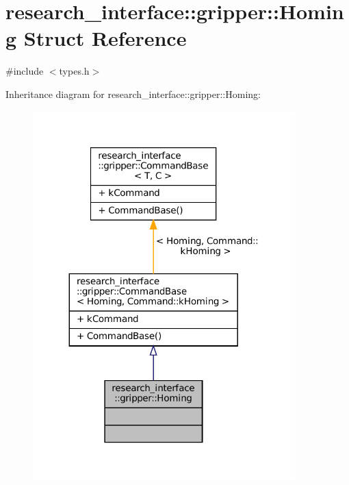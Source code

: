 \hypertarget{structresearch__interface_1_1gripper_1_1Homing}{}\section{research\+\_\+interface\+:\+:gripper\+:\+:Homing Struct Reference}
\label{structresearch__interface_1_1gripper_1_1Homing}


{\ttfamily \#include $<$types.\+h$>$}



Inheritance diagram for research\+\_\+interface\+:\+:gripper\+:\+:Homing\+:
\nopagebreak
\begin{figure}[H]
\begin{center}
\leavevmode
\includegraphics[width=287pt]{structresearch__interface_1_1gripper_1_1Homing__inherit__graph}
\end{center}
\end{figure}


